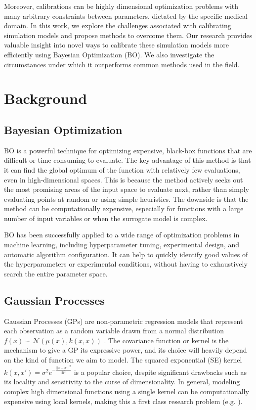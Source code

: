 \documentclass[sn-mathphys,Numbered]{sn-jnl}%
\begin{document}
Moreover, calibrations can be highly dimensional optimization problems with many arbitrary constraints between parameters, dictated by the specific medical domain. In this work, we explore the challenges associated with calibrating simulation models and propose methods to overcome them. Our research provides valuable insight into novel ways to calibrate these simulation models more efficiently using Bayesian Optimization (BO). We also investigate the circumstances under which it outperforms common methods used in the field.	

\section{Background}

\subsection{Bayesian Optimization}

BO is a powerful technique for optimizing expensive, black-box functions that are difficult or time-consuming to evaluate\cite{bayesian-opt}. The key advantage of this method is that it can find the global optimum of the function with relatively few evaluations, even in high-dimensional spaces. This is because the method actively seeks out the most promising areas of the input space to evaluate next, rather than simply evaluating points at random or using simple heuristics. The downside is that the method can be computationally expensive, especially for functions with a large number of input variables or when the surrogate model is complex.

BO has been successfully applied to a wide range of optimization problems in machine learning, including hyperparameter tuning, experimental design, and automatic algorithm configuration. It can help to quickly identify good values of the hyperparameters or experimental conditions, without having to exhaustively search the entire parameter space.

\subsection{Gaussian Processes}
Gaussian Processes (GPs) are non-parametric regression models that represent each observation as a random variable drawn from a normal distribution $f(x) \sim \mathcal{N}(\mu(x), k(x,x))$ \cite{gaussian-processes}. The covariance function or kernel is the mechanism to give a GP its expressive power, and its choice will heavily depend on the kind of function we aim to model\cite{kernel-composition}. The squared exponential (SE) kernel $k(x,x') = \sigma^2 e^{-\frac{||x-x'||^2}{2l^2}}$ is a popular choice, despite significant drawbacks such as its locality and sensitivity to the curse of dimensionality\cite{curse-dimensionality}.
In general, modeling complex high dimensional functions using a single kernel can be computationally expensive using local kernels, making this a first class research problem (e.g. \cite{gp-high-dim}\cite{gp-high-dim2}).
\end{document}
